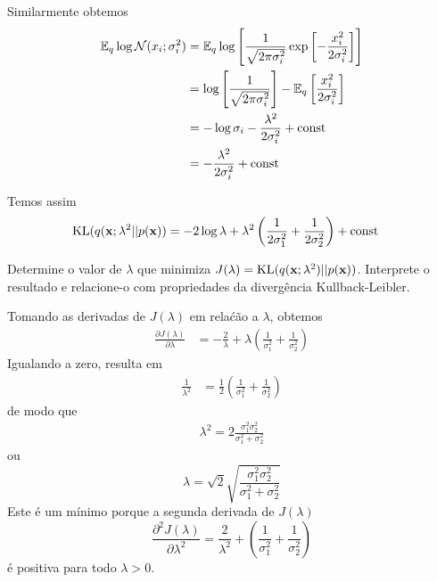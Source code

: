 \begin{exenumerate}
\begin{solution}
        Similarmente obtemos
        \begin{align}
            \mathbb{E}_q \log \mathcal{N}(x_i ; \sigma_i^2) & = \mathbb{E}_q \log \left[ \frac{1}{\sqrt{2\pi \sigma_i^2}} \exp \left[-\frac{x_i^2}{2 \sigma_i^2} \right] \right]\\
            & = \log \left[ \frac{1}{\sqrt{2\pi \sigma_i^2}}\right] -\mathbb{E}_q \left[\frac{x_i^2}{2 \sigma_i^2}\right]\\
            & = -\log \sigma_i - \frac{\lambda^2}{2\sigma_i^2} + \text{const}\\
            & = - \frac{\lambda^2}{2\sigma_i^2} + \text{const}
        \end{align}
        
        Temos assim
        \begin{align}
            \text{KL}(q(\mathbf{x}; \lambda^2 || p(\mathbf{x}))  & =  -2 \log \lambda + \lambda^2\left(\frac{1}{2\sigma_1^2}+\frac{1}{2\sigma_2^2}\right)+\text{const}
        \end{align}     
        
    \end{solution}
    
    
    
    \item Determine o valor de $\lambda$ que minimiza $J(\lambda) =
    \text{KL}(q(\mathbf{x}; \lambda^2) || p(\mathbf{x}))$. Interprete o resultado e
    relacione-o com propriedades da diverg\^encia Kullback-Leibler.
    
    \begin{solution}
        
        Tomando as derivadas de $J(\lambda)$ em rela\'c\~ao a $\lambda$, obtemos
        \begin{align}
            \frac{\partial J(\lambda)}{\partial \lambda} & = -\frac{2}{\lambda} + \lambda \left(\frac{1}{\sigma_1^2}+\frac{1}{\sigma_2^2}\right)
        \end{align}
        Igualando a zero, resulta em
        \begin{align}
            \frac{1}{\lambda^2} &= \frac{1}{2}\left(\frac{1}{\sigma_1^2}+\frac{1}{\sigma_2^2}\right)
        \end{align}
        de modo que
        \begin{align}
            \lambda^2 = 2 \frac{\sigma_1^2 \sigma_2^2}{\sigma_1^2+\sigma_2^2}
        \end{align}
        ou
        \begin{equation}
            \lambda = \sqrt{2} \sqrt{\frac{\sigma_1^2 \sigma_2^2}{\sigma_1^2+\sigma_2^2}}
        \end{equation}
        Este \'e um m\'inimo porque a segunda derivada de $J(\lambda)$
        \begin{equation}
            \frac{\partial^2 J(\lambda)}{\partial \lambda^2} = \frac{2}{\lambda^2} + \left(\frac{1}{\sigma_1^2}+\frac{1}{\sigma_2^2}\right)
        \end{equation}
        \'e positiva para todo $\lambda > 0$.
        

\end{solution}
\end{exenumerate}

